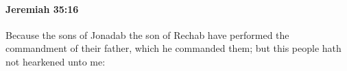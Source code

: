 
		\paragraph{Jeremiah 35:16} %
			\label{JEREMIAH-35-16}

			Because the sons of Jonadab the son of Rechab have performed the commandment of their father, which he commanded them; but this people hath not hearkened unto me:



